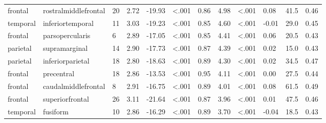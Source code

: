 \documentclass{article}
\begin{document}
\begin{longtable}{llR{1.5cm}R{1cm}R{1.3cm}R{1cm}R{1cm}R{1.3cm}R{1cm}R{1.8cm}R{1.3cm}R{1.8cm}}
   frontal &      rostralmiddlefrontal &           20 &                  2.72 &           -19.93 &      \textless.001 &                               0.86 &                          4.98 &                   \textless.001 &  0.08 &   41.5 &      0.46 \\
  temporal &          inferiortemporal &           11 &                  3.03 &           -19.23 &      \textless.001 &                               0.85 &                          4.60 &                   \textless.001 & -0.01 &   29.0 &      0.45 \\
   frontal &           parsopercularis &            6 &                  2.89 &           -17.05 &      \textless.001 &                               0.85 &                          4.41 &                   \textless.001 &  0.06 &   20.5 &      0.43 \\
  parietal &             supramarginal &           14 &                  2.90 &           -17.73 &      \textless.001 &                               0.87 &                          4.39 &                   \textless.001 &  0.02 &   15.0 &      0.43 \\
  parietal &          inferiorparietal &           18 &                  2.80 &           -18.63 &      \textless.001 &                               0.89 &                          4.30 &                   \textless.001 &  0.02 &   34.5 &      0.47 \\
   frontal &                precentral &           18 &                  2.86 &           -13.53 &      \textless.001 &                               0.95 &                          4.11 &                   \textless.001 &  0.00 &   27.5 &      0.44 \\
   frontal &       caudalmiddlefrontal &            8 &                  2.91 &           -16.75 &      \textless.001 &                               0.89 &                          4.01 &                   \textless.001 &  0.08 &   61.5 &      0.49 \\
   frontal &           superiorfrontal &           26 &                  3.11 &           -21.64 &      \textless.001 &                               0.87 &                          3.96 &                   \textless.001 &  0.01 &   47.5 &      0.46 \\
  temporal &                  fusiform &           10 &                  2.86 &           -16.29 &      \textless.001 &                               0.89 &                          3.70 &                   \textless.001 & -0.04 &   18.5 &      0.43 \\

\end{longtable}
\end{document}
